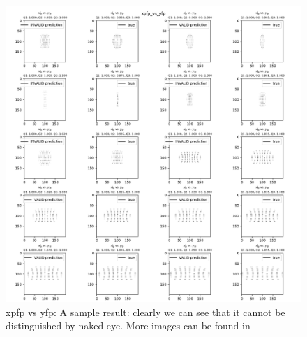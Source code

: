 \documentclass[conference]{IEEEtran}
\begin{document}
\begin{figure}[h]
  \centering
  \includegraphics[scale=0.6]{images/final_results_xpfp_vs_yfp.png}
  \caption{xpfp vs yfp: A sample result: clearly we can see that it cannot be distinguished by naked eye. More images can be found in \cite{Result_images}}
  \label{fig: images and their predicted images}
\end{figure}



\break
   

\end{document}
